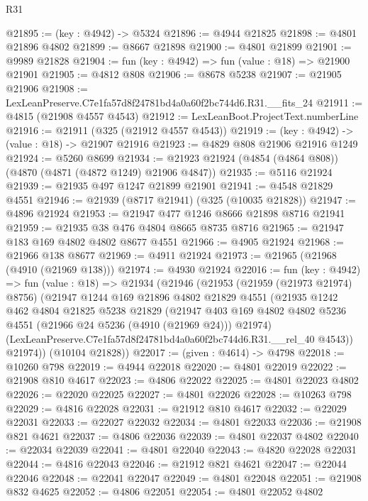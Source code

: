 \begin{lexlean}{R31}
\begin{coremodule}
@21895 := (key : @4942) -> @5324
@21896 := @4944 @21825
@21898 := @4801 @21896 @4802
@21899 := @8667 @21898
@21900 := @4801 @21899
@21901 := @9989 @21828
@21904 := fun (key : @4942) => fun (value : @18) => @21900 @21901
@21905 := @4812 @808
@21906 := @8678 @5238
@21907 := @21905 @21906
@21908 := LexLeanPreserve.C7e1fa57d8f24781bd4a0a60f2bc744d6.R31.__fits_24
@21911 := @4815 (@21908 @4557 @4543)
@21912 := LexLeanBoot.ProjectText.numberLine
@21916 := @21911 (@325 (@21912 @4557 @4543))
@21919 := (key : @4942) -> (value : @18) -> @21907 @21916
@21923 := @4829 @808 @21906 @21916 @1249
@21924 := @5260 @8699
@21934 := @21923 @21924 (@4854 (@4864 @808)) (@4870 (@4871 (@4872 @1249) @21906 @4847))
@21935 := @5116 @21924
@21939 := @21935 @497 @1247 @21899 @21901
@21941 := @4548 @21829 @4551
@21946 := @21939 (@8717 @21941) (@325 (@10035 @21828))
@21947 := @4896 @21924
@21953 := @21947 @477 @1246 @8666 @21898 @8716 @21941
@21959 := @21935 @38 @476 @4804 @8665 @8735 @8716
@21965 := @21947 @183 @169 @4802 @4802 @8677 @4551
@21966 := @4905 @21924
@21968 := @21966 @138 @8677
@21969 := @4911 @21924
@21973 := @21965 (@21968 (@4910 (@21969 @138)))
@21974 := @4930 @21924
@22016 := fun (key : @4942) =>
  fun (value : @18) =>
  @21934
    (@21946
      (@21953
        (@21959 (@21973 @21974) @8756)
        (@21947
          @1244
          @169
          @21896
          @4802
          @21829
          @4551
          (@21935
            @1242
            @462
            @4804
            @21825
            @5238
            @21829
            (@21947
              @403
              @169
              @4802
              @4802
              @5236
              @4551
              (@21966 @24 @5236 (@4910 (@21969 @24)))
              @21974)
            (LexLeanPreserve.C7e1fa57d8f24781bd4a0a60f2bc744d6.R31.__rel_40 @4543))
          @21974))
      (@10104 @21828))
@22017 := (given : @4614) -> @4798
@22018 := @10260 @798
@22019 := @4944 @22018
@22020 := @4801 @22019
@22022 := @21908 @810 @4617
@22023 := @4806 @22022
@22025 := @4801 @22023 @4802
@22026 := @22020 @22025
@22027 := @4801 @22026
@22028 := @10263 @798
@22029 := @4816 @22028
@22031 := @21912 @810 @4617
@22032 := @22029 @22031
@22033 := @22027 @22032
@22034 := @4801 @22033
@22036 := @21908 @821 @4621
@22037 := @4806 @22036
@22039 := @4801 @22037 @4802
@22040 := @22034 @22039
@22041 := @4801 @22040
@22043 := @4820 @22028 @22031
@22044 := @4816 @22043
@22046 := @21912 @821 @4621
@22047 := @22044 @22046
@22048 := @22041 @22047
@22049 := @4801 @22048
@22051 := @21908 @832 @4625
@22052 := @4806 @22051
@22054 := @4801 @22052 @4802

\end{coremodule}
\end{lexlean}
